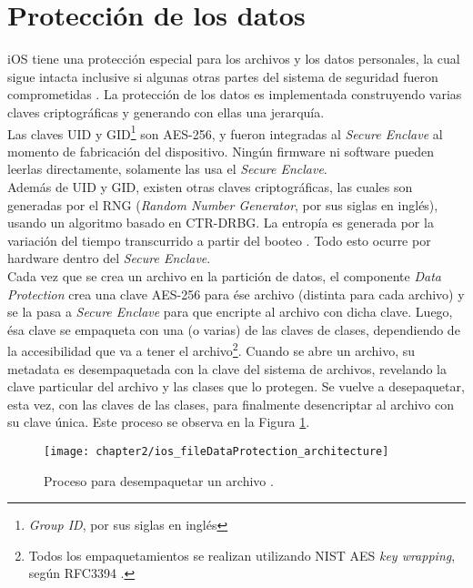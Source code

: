 \section{Protección de los datos} \label{fig:ch02:data-protection}
iOS tiene una protección especial para los archivos y los datos personales, la cual sigue intacta inclusive si algunas otras partes del sistema de seguridad fueron comprometidas \cite{asg}. La protección de los datos es implementada construyendo varias claves criptográficas y generando con ellas una jerarquía.\\
Las claves UID y GID\footnote{\textit{Group ID}, por sus siglas en inglés} son AES-256, y fueron integradas al \textit{Secure Enclave} al momento de fabricación del dispositivo. Ningún firmware ni software pueden leerlas directamente, solamente las usa el \textit{Secure Enclave}.\\
Además de UID y GID, existen otras claves criptográficas, las cuales son generadas por el RNG (\textit{Random Number Generator}, por sus siglas en inglés), usando un algoritmo basado en CTR-DRBG. La entropía es generada por la variación del tiempo transcurrido a partir del booteo \cite{asg}. Todo esto ocurre por hardware dentro del \textit{Secure Enclave}.\\
Cada vez que se crea un archivo en la partición de datos, el componente \textit{Data Protection} crea una clave AES-256 para ése archivo (distinta para cada archivo) y se la pasa a \textit{Secure Enclave} para que encripte al archivo con dicha clave. Luego, ésa clave se empaqueta con una (o varias) de las claves de clases, dependiendo de la accesibilidad que va a tener el archivo\footnote{Todos los empaquetamientos se realizan utilizando NIST AES \textit{key wrapping}, según RFC3394 \cite{asg}.}.
Cuando se abre un archivo, su metadata es desempaquetada con la clave del sistema de archivos, revelando la clave particular del archivo y las clases que lo protegen. Se vuelve a desepaquetar, esta vez, con las claves de las clases, para finalmente desencriptar al archivo con su clave única. Este proceso se observa en la Figura \ref{fig:ch02:dataProtection}.
\begin{figure}[hbtp]
    \centering
    \texttt{[image: chapter2/ios\_fileDataProtection\_architecture]}
    \caption{Proceso para desempaquetar un archivo \cite{asg}.}
    \label{fig:ch02:dataProtection}
\end{figure}
